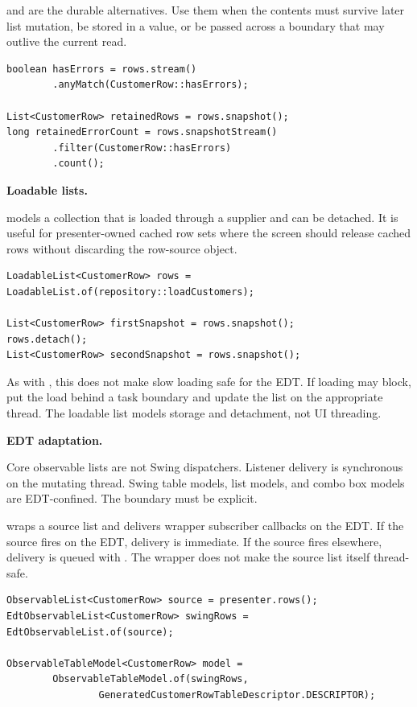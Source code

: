  and  are the durable alternatives. Use
them when the contents must survive later list mutation, be stored in a value,
or be passed across a boundary that may outlive the current read.

\begin{lstlisting}[caption={Immediate traversal versus durable snapshot.}]
boolean hasErrors = rows.stream()
        .anyMatch(CustomerRow::hasErrors);

List<CustomerRow> retainedRows = rows.snapshot();
long retainedErrorCount = rows.snapshotStream()
        .filter(CustomerRow::hasErrors)
        .count();
\end{lstlisting}

\textbf{Loadable lists.}

 models a collection that is loaded through a supplier and
can be detached. It is useful for presenter-owned cached row sets where the
screen should release cached rows without discarding the row-source object.

\begin{lstlisting}[caption={A detachable loaded row source.}]
LoadableList<CustomerRow> rows = LoadableList.of(repository::loadCustomers);

List<CustomerRow> firstSnapshot = rows.snapshot();
rows.detach();
List<CustomerRow> secondSnapshot = rows.snapshot();
\end{lstlisting}

As with , this does not make slow loading safe for the EDT.
If loading may block, put the load behind a task boundary and update the list on
the appropriate thread. The loadable list models storage and detachment, not UI
threading.

\textbf{EDT adaptation.}

Core observable lists are not Swing dispatchers. Listener delivery is
synchronous on the mutating thread. Swing table models, list models, and combo
box models are EDT-confined. The boundary must be explicit.

 wraps a source list and delivers wrapper subscriber
callbacks on the EDT. If the source fires on the EDT, delivery is immediate. If
the source fires elsewhere, delivery is queued with .
The wrapper does not make the source list itself thread-safe.

\begin{lstlisting}[caption={Adapting a row source before Swing consumes it.}]
ObservableList<CustomerRow> source = presenter.rows();
EdtObservableList<CustomerRow> swingRows = EdtObservableList.of(source);

ObservableTableModel<CustomerRow> model =
        ObservableTableModel.of(swingRows,
                GeneratedCustomerRowTableDescriptor.DESCRIPTOR);
\end{lstlisting}

